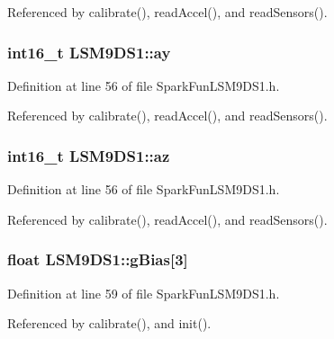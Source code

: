 Referenced by calibrate(), read\+Accel(), and read\+Sensors().

\subsubsection[{\texorpdfstring{ay}{ay}}]{\setlength{\rightskip}{0pt plus 5cm}int16\+\_\+t L\+S\+M9\+D\+S1\+::ay}\hypertarget{class_l_s_m9_d_s1_a978a357dedfa574d6e0fad33ad71e23f}{}\label{class_l_s_m9_d_s1_a978a357dedfa574d6e0fad33ad71e23f}


Definition at line 56 of file Spark\+Fun\+L\+S\+M9\+D\+S1.\+h.



Referenced by calibrate(), read\+Accel(), and read\+Sensors().

\subsubsection[{\texorpdfstring{az}{az}}]{\setlength{\rightskip}{0pt plus 5cm}int16\+\_\+t L\+S\+M9\+D\+S1\+::az}\hypertarget{class_l_s_m9_d_s1_aa631c8a90b90130b5be147dd4fae0841}{}\label{class_l_s_m9_d_s1_aa631c8a90b90130b5be147dd4fae0841}


Definition at line 56 of file Spark\+Fun\+L\+S\+M9\+D\+S1.\+h.



Referenced by calibrate(), read\+Accel(), and read\+Sensors().

\subsubsection[{\texorpdfstring{g\+Bias}{gBias}}]{\setlength{\rightskip}{0pt plus 5cm}float L\+S\+M9\+D\+S1\+::g\+Bias\mbox{[}3\mbox{]}}\hypertarget{class_l_s_m9_d_s1_a8c0354ee78e029b6715ee7110bcd8753}{}\label{class_l_s_m9_d_s1_a8c0354ee78e029b6715ee7110bcd8753}


Definition at line 59 of file Spark\+Fun\+L\+S\+M9\+D\+S1.\+h.



Referenced by calibrate(), and init().

